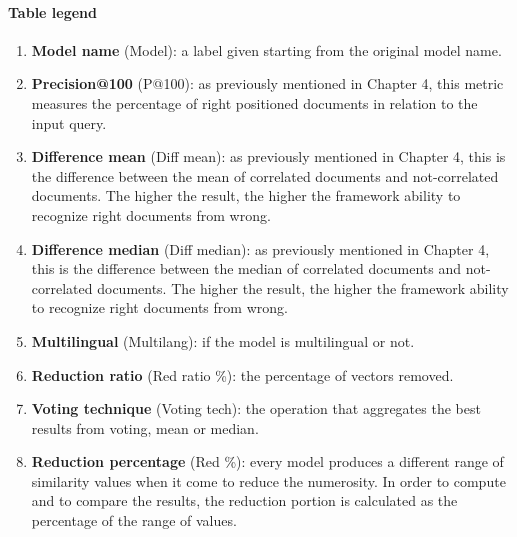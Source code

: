 \documentclass[\main/main.tex]{subfiles}
\begin{document}
\paragraph{Table legend} 
\begin{enumerate}
    \item \textbf{Model name} (Model): a label given starting from the original model name.
    \item \textbf{Precision@100} (P@100): as previously mentioned in Chapter 4, this metric measures the percentage of right positioned documents in relation to the input query.
    \item \textbf{Difference mean} (Diff mean): as previously mentioned in Chapter 4, this is the difference between the mean of correlated documents and not-correlated documents. The higher the result, the higher the framework ability to recognize right documents from wrong.
    \item \textbf{Difference median} (Diff median): as previously mentioned in Chapter 4, this is the difference between the median of correlated documents and not-correlated documents. The higher the result, the higher the framework ability to recognize right documents from wrong.
    \item \textbf{Multilingual} (Multilang): if the model is multilingual or not.
    \item \textbf{Reduction ratio} (Red ratio \%): the percentage of vectors removed.
    \item \textbf{Voting technique} (Voting tech): the operation that aggregates the best results from voting, mean or median.
    \item \textbf{Reduction percentage} (Red \%): every model produces a different range of similarity values when it come to reduce the numerosity. In order to compute and to compare the results, the reduction portion is calculated as the percentage of the range of values.
\end{enumerate}

\newpage
\end{document}
